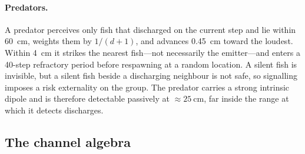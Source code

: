 \paragraph{Predators.}
A predator perceives only fish that discharged on the current step and lie within
\SI{60}{\centi\metre}, weights them by $1/(d+1)$, and advances
\SI{0.45}{\centi\metre} toward the loudest. Within \SI{4}{\centi\metre} it strikes
the nearest fish---not necessarily the emitter---and enters a 40-step refractory
period before respawning at a random location. A silent fish is invisible, but a
silent fish beside a discharging neighbour is not safe, so signalling imposes a
risk externality on the group. The predator carries a strong intrinsic dipole and
is therefore detectable passively at $\approx\SI{25}{\centi\metre}$, far inside
the range at which it detects discharges.

\subsection{The channel algebra}
\label{sec:algebra}

